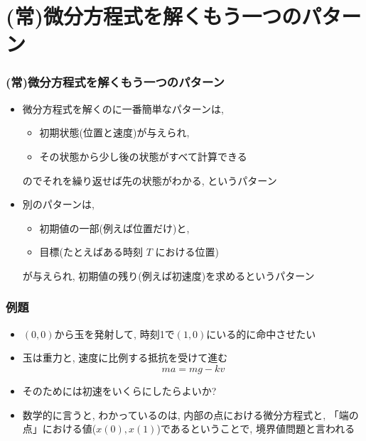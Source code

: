 \documentclass[12pt,dvipdfmx]{beamer}
\begin{document}
\iffalse
\section{(常)微分方程式を解くもう一つのパターン}
\begin{frame}
  \frametitle{(常)微分方程式を解くもう一つのパターン}

  \begin{itemize}
  \item 微分方程式を解くのに一番簡単なパターンは,
    \begin{itemize}
    \item 初期状態(位置と速度)が与えられ,
    \item その状態から少し後の状態がすべて計算できる
    \end{itemize}
    のでそれを繰り返せば先の状態がわかる, というパターン
    
  \item 別のパターンは,
    \begin{itemize}
    \item 初期値の一部(例えば位置だけ)と,
    \item 目標(たとえばある時刻 $T$ における位置)
    \end{itemize}
    が与えられ, 初期値の残り(例えば初速度)を求めるというパターン
  \end{itemize}
\end{frame}


\begin{frame}
  \frametitle{例題}
  \begin{itemize}
  \item $(0,0)$から玉を発射して, 時刻1で$(1,0)$にいる的に命中させたい
  \item 玉は重力と, 速度に比例する抵抗を受けて進む
    \[ ma = mg - kv \]
  \item そのためには初速をいくらにしたらよいか?
  \item 数学的に言うと, わかっているのは, 内部の点における微分方程式と,
    「端の点」における値($x(0), x(1)$)であるということで,
    境界値問題と言われる
  \end{itemize}
\end{frame}
\end{document}
